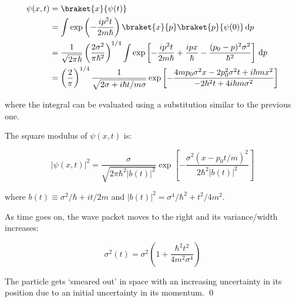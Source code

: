 \documentclass[12pt]{article}
\begin{document}
\begin{equation}
\begin{split}
    \psi(x, t) &= \braket{x}{\psi(t)} \\
    &= \int \exp \left( -\frac{ip^{2}t}{2m\hbar} \right) \braket{x}{p} \braket{p}{\psi(0)} \, \mathrm{d}p  \\
    &= \frac{1}{\sqrt{2\pi\hbar}} \left( \frac{2\sigma^{2}}{\pi \hbar^{2}} \right)^{1/4} \int \exp \left[ -\frac{ip^{2}t}{2m\hbar} + \frac{ipx}{\hbar} - \frac{(p_{0} - p)^{2}\sigma^{2}}{\hbar^{2}} \right] \, \mathrm{d}p \\
    &= \left( \frac{2}{\pi} \right)^{1/4} \frac{1}{\sqrt{2\sigma + i\hbar t/m\sigma}} \exp \left[ -\frac{4mp_{0} \sigma^{2} x - 2p_{0}^{2} \sigma^{2} t + i\hbar mx^{2}}{-2\hbar^{2} t + 4i\hbar m \sigma^{2}} \right]
\end{split}
\end{equation}

where the integral can be evaluated using a substitution similar to the previous one.

The square modulus of $\psi(x, t)$ is:

\begin{equation}
    \left| \psi(x, t) \right|^{2} = \frac{\sigma}{\sqrt{2\pi \hbar^{2} \left\lvert b(t) \right\rvert^{2}}} \exp \left[ -\frac{\sigma^{2} (x - p_{0}t/m)^{2}}{2\hbar^{2} \left\lvert b(t) \right\rvert^{2}} \right]
\end{equation}

where $b(t) \equiv \sigma^{2}/\hbar + it/2m$ and $\left\lvert b(t) \right\rvert^{2} = \sigma^{4}/\hbar^{2} + t^{2}/4m^{2}$.

As time goes on, the wave packet moves to the right and its variance/width increases:

\begin{equation}
    \sigma^{2}(t) = \sigma^{2} \left( 1 + \frac{\hbar^{2}t^{2}}{4m^{2}\sigma^{4}} \right)
\end{equation}

The particle gets `smeared out' in space with an increasing uncertainty in its position due to an initial uncertainty in its momentum.
\qed
\end{document}
